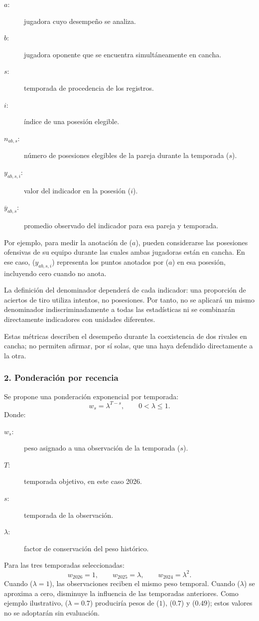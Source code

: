 \begin{description}
\item[$a$:] jugadora cuyo desempeño se analiza.
\item[$b$:] jugadora oponente que se encuentra simultáneamente en cancha.
\item[$s$:] temporada de procedencia de los registros.
\item[$i$:] índice de una posesión elegible.
\item[$n_{ab,s}$:] número de posesiones elegibles de la pareja durante la temporada ($s$).
\item[$y_{ab,s,i}$:] valor del indicador en la posesión ($i$).
\item[$\overline y_{ab,s}$:] promedio observado del indicador para esa pareja y temporada.
\end{description}

Por ejemplo, para medir la anotación de ($a$), pueden considerarse las posesiones ofensivas de su equipo durante las cuales ambas jugadoras están en cancha. En ese caso, ($y_{ab,s,i}$) representa los puntos anotados por ($a$) en esa posesión, incluyendo cero cuando no anota.

La definición del denominador dependerá de cada indicador: una proporción de aciertos de tiro utiliza intentos, no posesiones. Por tanto, no se aplicará un mismo denominador indiscriminadamente a todas las estadísticas ni se combinarán directamente indicadores con unidades diferentes.

Estas métricas describen el desempeño durante la coexistencia de dos rivales en cancha; no permiten afirmar, por sí solas, que una haya defendido directamente a la otra.

\subsubsection*{2. Ponderación por recencia}
Se propone una ponderación exponencial por temporada:
\[
w_s=\lambda^{T-s},\qquad 0<\lambda\leq 1.
\]
Donde:
\begin{description}
\item[$w_s$:] peso asignado a una observación de la temporada ($s$).
\item[$T$:] temporada objetivo, en este caso 2026.
\item[$s$:] temporada de la observación.
\item[$\lambda$:] factor de conservación del peso histórico.
\end{description}
Para las tres temporadas seleccionadas:
\[
w_{2026}=1,\qquad w_{2025}=\lambda,\qquad w_{2024}=\lambda^2.
\]
Cuando ($\lambda=1$), las observaciones reciben el mismo peso temporal. Cuando ($\lambda$) se aproxima a cero, disminuye la influencia de las temporadas anteriores. Como ejemplo ilustrativo, ($\lambda=0.7$) produciría pesos de ($1$), ($0.7$) y ($0.49$); estos valores no se adoptarán sin evaluación.

